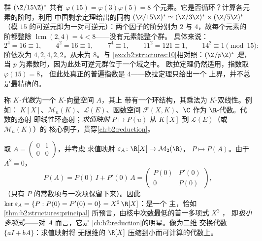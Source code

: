 \begin{example}[无生成元的可逆元群]\label{ex:b2:structures:units15}
群 $(\Z/15\Z)^*$ 共有 $\varphi(15) = \varphi(3)\varphi(5)
= 8$ 个元素。它是否循环？计算各元素的阶时，利用
中国剩余定理给出的同构 $(\Z/15\Z)^* \simeq (\Z/3\Z)^* \times (\Z/5\Z)^*$
（模 $15$ 的可逆元即为一对可逆元）：两个因子的阶分别为
$2$ 与 $4$，故每个元素的阶都整除
$\operatorname{lcm}(2, 4) = 4 < 8$——没有元素能整个群。
具体来说：
\[
2^4 = 16 \equiv 1, \qquad
4^2 = 16 \equiv 1, \qquad
7^4 \equiv 1, \qquad
11^2 = 121 \equiv 1, \qquad
14^2 \equiv 1 \pmod{15} :
\]
阶依次为 $4, 2, 4, 2, 2$，从未为 $8$。与
\cref{exo:b2:structures:10}相对照：$(\Z/p\Z)^*$ \emph{是}，
当 $p$ 为素数时，因为此处可逆元群位于一个域之中。
欧拉定理仍然适用，指数取 $\varphi(15) = 8$，
但此处真正的普遍指数是 $4$——欧拉定理只给出一个
上界，并不总是最精确的。
\end{example}

\begin{definition}[代数]\label{def:b2:structures:algebra}
称 \emph{$K$-代数}为一个 $K$-向量空间 $A$，其上
带有一个环结构，其乘法为 $K$-双线性。例如：
$K[X]$、$\mathcal{M}_n(K)$、$\mathcal{L}(E)$、函数空间
$\mathcal{F}(X, K)$、$\C$ 作为 $\R$-代数。代数的态射
即线性环态射；\emph{求值映射} $P \mapsto P(u)$
从 $K[X]$ 到 $\mathcal{L}(E)$（或 $\mathcal{M}_n(K)$）的
核心例子，贯穿\cref{ch:b2:reduction}。
\end{definition}

\begin{example}[一个求值映射及其核]\label{ex:b2:structures:evaluation}
取 $A = \begin{pmatrix}0 & 1\\ 0 & 0\end{pmatrix}$，并考虑
求值映射 $\varepsilon_A \colon \R[X] \to \mathcal{M}_2(\R)$，
$P \mapsto P(A)$。由于 $A^2 = 0$，
\[
P(A) = P(0)\,I + P'(0)\,A =
\begin{pmatrix} P(0) & P'(0)\\ 0 & P(0)\end{pmatrix},
\]
（只有 $P$ 的常数项与一次项保留下来）。因此
$\ker\varepsilon_A = \{P : P(0) = P'(0) = 0\} = X^2\,\R[X]$：是一个
主，恰如\cref{thm:b2:structures:principal}
所预言，由核中次数最低的首一多项式 $X^2$ ，
即\emph{极小多项式}——对 $A$ 而言，它是
\cref{ch:b2:reduction}的明星。像为二维
交换代数 $\{aI + bA\}$：求值映射将
无限维的 $\R[X]$ 压缩到小而可计算的代数上。
\end{example}


